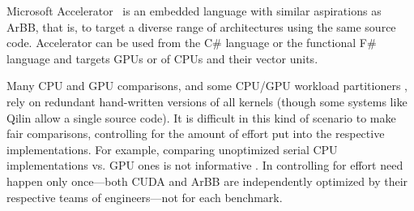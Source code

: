 Microsoft Accelerator~ is an embedded language with similar 
aspirations as ArBB, that is, to target a diverse range of architectures using the 
same source code. Accelerator can be used from the C\# language or the 
functional F\# language and targets GPUs or of CPUs and their
vector units.


Many CPU and GPU comparisons, and some CPU/GPU workload partitioners , rely on
redundant hand-written versions of all kernels
(though some systems like Qilin  allow a single source code).
It is difficult in this kind of scenario
to make fair comparisons, controlling for the
amount of effort put into the respective implementations.
For example, comparing unoptimized serial CPU implementations vs. GPU
ones is not informative .
In \systemname{} controlling for effort
need happen only once---both CUDA and ArBB are
independently optimized by their respective teams of engineers---not for each benchmark.




